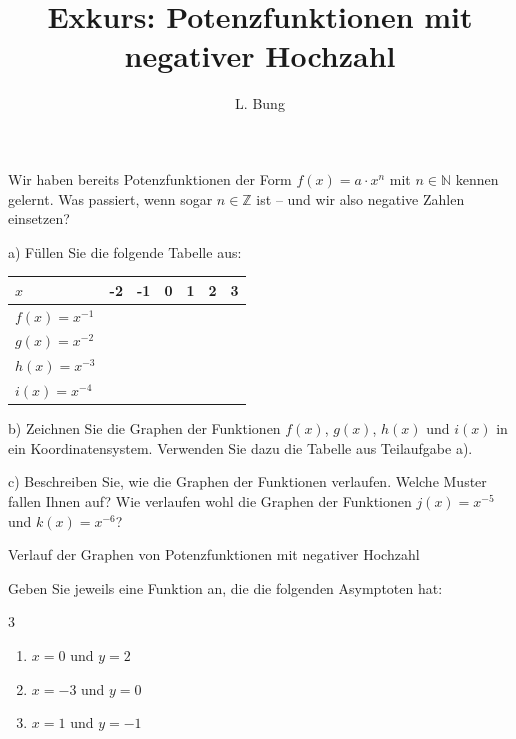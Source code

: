\documentclass[11pt, a4paper, oneside]{article}
\begin{document}
	\author{L. Bung}
	\title{Exkurs: Potenzfunktionen \hspace{10cm} mit negativer Hochzahl}
	\subject{Mathematik}
	\maketitle
	
	Wir haben bereits Potenzfunktionen der Form $f(x) = a \cdot x^n$ mit $n \in \mathbb{N}$ kennen gelernt.
	Was passiert, wenn sogar $n \in \mathbb{Z}$ ist -- und wir also negative Zahlen einsetzen?
	
	
	a) Füllen Sie die folgende Tabelle aus:
	
	\begin{table}[H]
		\centering
		\begin{tabularx}{\textwidth}{| X | p{1.5cm} | p{1.5cm} | p{1.5cm} | p{1.5cm} | p{1.5cm} | p{1.5cm} |}
			\hline
			$x$ & -2 & -1 & 0 & 1 & 2 & 3\\
			\hline
			\hline
			$f(x) = x^{-1}$ &&&&&&\\
			\hline
			$g(x) = x^{-2}$ &&&&&&\\
			\hline
			$h(x) = x^{-3}$ &&&&&&\\
			\hline
			$i(x) = x^{-4}$ &&&&&&\\
			\hline
		\end{tabularx}
	\end{table}
	
	b) Zeichnen Sie die Graphen der Funktionen $f(x)$, $g(x)$, $h(x)$ und $i(x)$ in ein Koordinatensystem.
	Verwenden Sie dazu die Tabelle aus Teilaufgabe a).
	
	\checkered[10cm]
	
	c) Beschreiben Sie, wie die Graphen der Funktionen verlaufen.
	Welche Muster fallen Ihnen auf?
	Wie verlaufen wohl die Graphen der Funktionen $j(x) = x^{-5}$ und $k(x) = x^{-6}$?
	
	\lines
	
	\begin{hint}{Verlauf der Graphen von Potenzfunktionen mit negativer Hochzahl}
		\phantom{x}\vspace{6.5cm}
	\end{hint}
	
	
	Geben Sie jeweils eine Funktion an, die die folgenden Asymptoten hat:
	
	\begin{multicols}{3}
		\begin{enumerate}[label=\alph*)]
			\item $x=0$ und $y=2$
			\item $x=-3$ und $y=0$
			\item $x=1$ und $y=-1$
		\end{enumerate}
	\end{multicols}
	
	\checkered[4cm]
	
	\let\clearpage\relax
\end{document}
